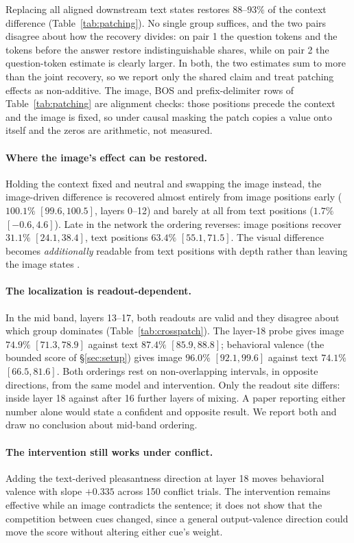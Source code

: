 \documentclass{article}
\begin{document}
Replacing all aligned downstream text states restores $88$--$93\%$ of the context difference (Table~\ref{tab:patching}). No single group suffices, and the two pairs disagree about how the recovery divides: on pair 1 the question tokens and the tokens before the answer restore indistinguishable shares, while on pair 2 the question-token estimate is clearly larger. In both, the two estimates sum to more than the joint recovery, so we report only the shared claim and treat patching effects as non-additive. The image, BOS and prefix-delimiter rows of Table~\ref{tab:patching} are alignment checks: those positions precede the context and the image is fixed, so under causal masking the patch copies a value onto itself and the zeros are arithmetic, not measured.

\paragraph{Where the image's effect can be restored.}
Holding the context fixed and neutral and swapping the image instead, the image-driven difference is recovered almost entirely from image positions early ($100.1\%$ $[99.6,100.5]$, layers 0--12) and barely at all from text positions ($1.7\%$ $[-0.6,4.6]$). Late in the network the ordering reverses: image positions recover $31.1\%$ $[24.1,38.4]$, text positions $63.4\%$ $[55.1,71.5]$. The visual difference becomes \emph{additionally} readable from text positions with depth rather than leaving the image states \citep{basu2024, whatsintheimage2025}.

\paragraph{The localization is readout-dependent.}
In the mid band, layers 13--17, both readouts are valid and they disagree about which group dominates (Table~\ref{tab:crosspatch}). The layer-18 probe gives image $74.9\%$ $[71.3,78.9]$ against text $87.4\%$ $[85.9,88.8]$; behavioral valence (the bounded score of \S\ref{sec:setup}) gives image $96.0\%$ $[92.1,99.6]$ against text $74.1\%$ $[66.5,81.6]$. Both orderings rest on non-overlapping intervals, in opposite directions, from the same model and intervention. Only the readout site differs: inside layer 18 against after 16 further layers of mixing. A paper reporting either number alone would state a confident and opposite result. We report both and draw no conclusion about mid-band ordering.

\paragraph{The intervention still works under conflict.}
Adding the text-derived pleasantness direction at layer 18 moves behavioral valence with slope $+0.335$ across 150 conflict trials. The intervention remains effective while an image contradicts the sentence; it does not show that the competition between cues changed, since a general output-valence direction could move the score without altering either cue's weight.
\end{document}
